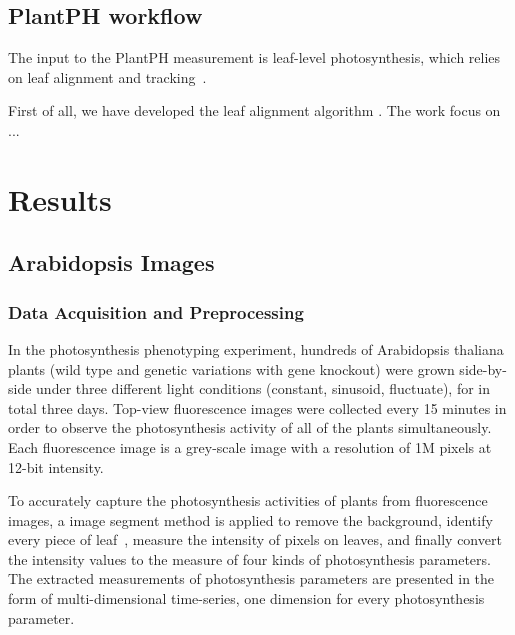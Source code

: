 \documentclass{bioinfo}
\begin{document}
\begin{methods}
\subsection{PlantPH workflow}

The input to the PlantPH measurement is leaf-level photosynthesis, which relies on leaf alignment and tracking~\citep{yin2014}. %

First of all, we have developed the leaf alignment algorithm \citep{yin2014}. The work focus on ...



\end{methods}
\section{Results}

\subsection{Arabidopsis Images}

\subsubsection{Data Acquisition and Preprocessing}

In the photosynthesis phenotyping experiment, hundreds of Arabidopsis thaliana plants (wild type and genetic variations with gene knockout) were grown side-by-side under three different light conditions (constant, sinusoid, fluctuate), for in total three days.
%
Top-view fluorescence images were collected every 15 minutes in order to observe the photosynthesis activity of all of the plants simultaneously. Each fluorescence image is a grey-scale image with a resolution of 1M pixels at 12-bit intensity.

To accurately capture the photosynthesis activities of plants from fluorescence images, a image segment method is applied to remove the background, identify every piece of leaf~\citep{yin2014}, measure the intensity of pixels on leaves, and finally convert the intensity values to the measure of four kinds of photosynthesis parameters.
%
The extracted measurements of photosynthesis parameters are presented in the form of multi-dimensional time-series, one dimension for every photosynthesis parameter.
%
\end{document}

